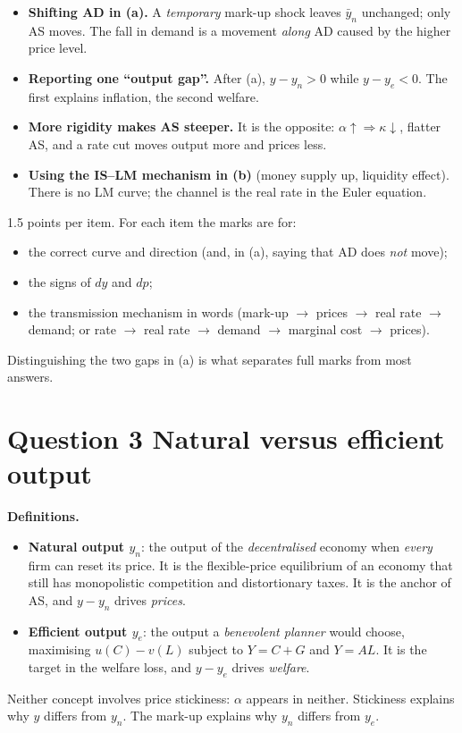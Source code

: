 \documentclass[11pt, a4paper]{article}
\newcommand{\passo}[1]{\medskip\noindent\textbf{#1}\par\nobreak}
\newcommand{\ybn}{\bar y_n}
\begin{document}
\begin{tcolorbox}[trapbox, title={Traps in Question 2}]
\small
\begin{itemize}
\item \textbf{Shifting AD in (a).} A \emph{temporary} mark-up shock leaves $\ybn$ unchanged;
      only AS moves. The fall in demand is a movement \emph{along} AD caused by the higher
      price level.
\item \textbf{Reporting one ``output gap''.} After (a), $y-y_n>0$ while $y-y_e<0$. The first
      explains inflation, the second welfare.
\item \textbf{More rigidity makes AS steeper.} It is the opposite: $\alpha\uparrow\Rightarrow
      \kappa\downarrow$, flatter AS, and a rate cut moves output more and prices less.
\item \textbf{Using the IS--LM mechanism in (b)} (money supply up, liquidity effect). There
      is no LM curve; the channel is the real rate in the Euler equation.
\end{itemize}
\end{tcolorbox}

\begin{tcolorbox}[rubricbox]
\small
1.5 points per item. For each item the marks are for:
\begin{itemize}
\item the correct curve and direction (and, in (a), saying that AD does \emph{not} move);
\item the signs of $dy$ and $dp$;
\item the transmission mechanism in words (mark-up $\to$ prices $\to$ real rate $\to$
      demand; or rate $\to$ real rate $\to$ demand $\to$ marginal cost $\to$ prices).
\end{itemize}
Distinguishing the two gaps in (a) is what separates full marks from most answers.
\end{tcolorbox}

\section{Question 3 \quad Natural versus efficient output}

\passo{Definitions.}
\begin{itemize}
\item \textbf{Natural output $y_n$}: the output of the \emph{decentralised} economy when
      \emph{every} firm can reset its price. It is the flexible-price equilibrium of an
      economy that still has monopolistic competition and distortionary taxes. It is the
      anchor of AS, and $y-y_n$ drives \emph{prices}.
\item \textbf{Efficient output $y_e$}: the output a \emph{benevolent planner} would choose,
      maximising $u(C)-v(L)$ subject to $Y=C+G$ and $Y=AL$. It is the target in the
      welfare loss, and $y-y_e$ drives \emph{welfare}.
\end{itemize}
Neither concept involves price stickiness: $\alpha$ appears in neither. Stickiness explains
why $y$ differs from $y_n$. The mark-up explains why $y_n$ differs from $y_e$.
\end{document}
